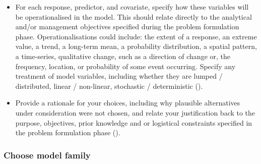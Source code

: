 \documentclass[
]{article}
\providecommand{\tightlist}{%
  \setlength{\itemsep}{0pt}\setlength{\parskip}{0pt}}
\begin{document}
\begin{tcolorbox}[enhanced jigsaw, opacitybacktitle=0.6, bottomrule=.15mm, leftrule=.75mm, rightrule=.15mm, colbacktitle=quarto-callout-caution-color!10!white, toprule=.15mm, titlerule=0mm, left=2mm, colframe=quarto-callout-caution-color-frame, breakable, title=\textcolor{quarto-callout-caution-color}{\faFire}\hspace{0.5em}{Preregistration Item}, opacityback=0, coltitle=black, bottomtitle=1mm, colback=white, toptitle=1mm, arc=.35mm]

\begin{itemize}
\tightlist
\item[$\square$]
  For each response, predictor, and covariate, specify how these
  variables will be operationalised in the model. This should relate
  directly to the analytical and/or management objectives specified
  during the problem formulation phase. Operationalisations could
  include: the extent of a response, an extreme value, a trend, a
  long-term mean, a probability distribution, a spatial pattern, a
  time-series, qualitative change, such as a direction of change or, the
  frequency, location, or probability of some event occurring. Specify
  any treatment of model variables, including whether they are lumped /
  distributed, linear / non-linear, stochastic / deterministic
  ().
\item[$\square$]
  Provide a rationale for your choices, including why plausible
  alternatives under consideration were not chosen, and relate your
  justification back to the purpose, objectives, prior knowledge and or
  logistical constraints specified in the problem formulation phase
  ().
\end{itemize}

\end{tcolorbox}

\subsubsection{Choose model family}\label{choose-model-family}
\end{document}
